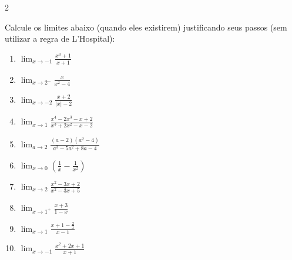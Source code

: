 \documentclass[12pt,a4paper]{article}
\begin{document}
\begin{multicols*}{2}
\begin{description}[font=\bfseries, leftmargin=0pt]
  \item[Prob 1.24:] Calcule os limites abaixo (quando eles existirem) justificando seus passos (sem utilizar a regra de L'Hospital):
  \begin{enumerate}[label=(\alph*)]
    \item $\displaystyle\lim_{x\to -1} \frac{x^3+1}{x+1}$
    \item $\displaystyle\lim_{x\to 2^-} \frac{x}{x^2-4}$
    \item $\displaystyle\lim_{x\to -2} \frac{x+2}{|x|-2}$
    \item $\displaystyle\lim_{x\to 1} \frac{x^4-2x^3-x+2}{x^3+2x^2-x-2}$
    \item $\displaystyle\lim_{a\to 2} \frac{(a-2)(a^2-4)}{a^3-5a^2+8a-4}$
    \item $\displaystyle\lim_{x\to 0} \left(\frac{1}{x} - \frac{1}{x^2}\right)$
    \item $\displaystyle\lim_{x\to 2} \frac{x^2-3x+2}{x^2-3x+5}$
    \item $\displaystyle\lim_{x\to 1^+} \frac{x+3}{1-x}$
    \item $\displaystyle\lim_{x\to 1} \frac{x+1-\frac{2}{x}}{x-1}$
    \item $\displaystyle\lim_{x\to -1} \frac{x^2+2x+1}{x+1}$
  \end{enumerate}
\end{description}

\end{multicols*}
\end{document}
